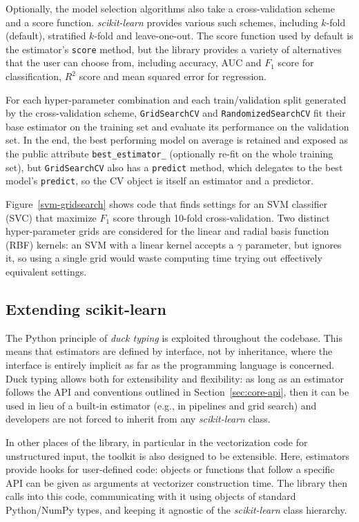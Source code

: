 \documentclass[twocolumn]{article}
\newcommand{\sklearn}{\textit{scikit-learn}\xspace}
\begin{document}
Optionally, the model selection algorithms
also take a cross-validation scheme and a score function.  \sklearn provides
various such schemes, including $k$-fold (default),
stratified $k$-fold and leave-one-out.
The score function used by default is the estimator's \texttt{score} method,
but the library provides a variety of
alternatives that the user can choose from,
including accuracy, AUC and $F_1$ score for classification,
$R^2$ score and mean squared error for regression.

For each hyper-parameter combination and each train/validation split
generated by the cross-validation scheme, \texttt{GridSearchCV}
and \texttt{RandomizedSearchCV} fit their base estimator on the training set and
evaluate its performance on the validation set.  In the end, the best performing
model on average is retained and exposed as the public attribute
\texttt{best\_estimator\_} (optionally re-fit on the whole training set),
but \texttt{GridSearchCV} also has a \texttt{predict} method,
which delegates to the best model's \texttt{predict},
so the CV object is itself an estimator and a predictor.

Figure~\ref{svm-gridsearch} shows code that finds
settings for an SVM classifier (SVC)
that maximize $F_1$ score
through 10-fold cross-validation.
Two distinct hyper-parameter grids are
considered for the linear and radial basis function (RBF) kernels:
an SVM with a linear kernel accepts a $\gamma$ parameter, but ignores it,
so using a single grid would waste computing time
trying out effectively equivalent settings.

\subsection{Extending scikit-learn}

The Python principle of \textit{duck typing} is exploited
throughout the codebase. This means that estimators are defined by interface,
not by inheritance, where the interface is entirely implicit
as far as the programming language is concerned.
Duck typing allows both for extensibility and
flexibility: as long as an estimator follows the API and conventions
outlined in Section~\ref{sec:core-api}, then it can be used in lieu of a
built-in estimator (e.g., in pipelines and grid search)
and developers are not forced to inherit from any \sklearn class.

In other places of the library, in particular in the vectorization code
for unstructured input, the toolkit is also designed to be
extensible. Here, estimators provide hooks for user-defined code: objects or
functions that follow a specific API can be given as arguments at vectorizer
construction time. The library then calls into this code,
communicating with it using objects of standard Python/NumPy types,
and keeping it agnostic of the \sklearn class hierarchy.
\end{document}
